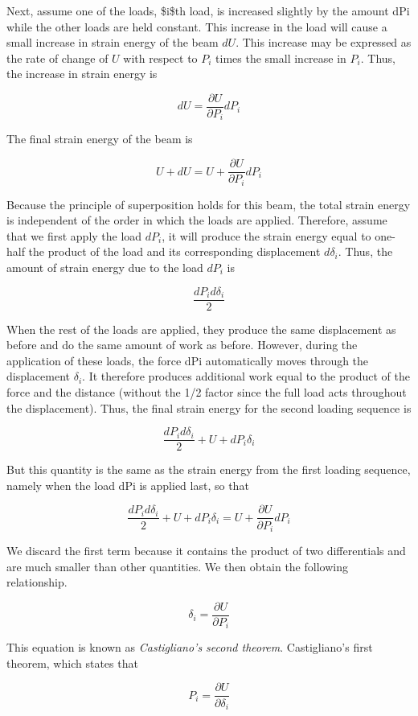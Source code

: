 \documentclass[a4paper,openany,12pt]{book}
\begin{document}
\begin{enumerate}
Next, assume one of the loads, \$i\$th load, is increased slightly by the
amount dPi while the other loads are held constant. This increase in the
load will cause a small increase in strain energy of the beam \(dU\). This
increase may be expressed as the rate of change of \(U\) with respect to
\(P_i\) times the small increase in \(P_i\). Thus, the increase in strain
energy is

$$dU = \frac{{\partial U}}{{\partial {P_i}}}d{P_i}$$

The final strain energy of the beam is

$$U + dU = U + \frac{{\partial U}}{{\partial {P_i}}}d{P_i}$$

Because the principle of superposition holds for this beam, the total
strain energy is independent of the order in which the loads are
applied. Therefore, assume that we first apply the load \(dP_i\), it will
produce the strain energy equal to one-half the product of the load and
its corresponding displacement \(d\delta_i\). Thus, the amount of strain
energy due to the load \(dP_i\) is

$$\frac{dP_id\delta _i}{2}$$

When the rest of the loads are applied, they produce the same
displacement as before and do the same amount of work as before.
However, during the application of these loads, the force dPi
automatically moves through the displacement \(\delta_i\). It therefore
produces additional work equal to the product of the force and the
distance (without the 1/2 factor since the full load acts throughout the
displacement). Thus, the final strain energy for the second loading
sequence is

$$\frac{dP_id\delta _i}{2} + U + dP_i\delta _i$$

But this quantity is the same as the strain energy from the first
loading sequence, namely when the load dPi is applied last, so that

$$\frac{dP_id\delta _i}{2} + U + dP_i\delta_i = U + \frac{\partial U}{\partial P_i}dP_i$$

We discard the first term because it contains the product of two
differentials and are much smaller than other quantities. We then obtain
the following relationship.

$$\delta_i = \frac{\partial U}{\partial P_i}$$

This equation is known as \emph{Castigliano's second theorem}. Castigliano's
first theorem, which states that

$$P_i = \frac{\partial U}{\partial \delta_i}$$


\end{enumerate}
\end{document}

